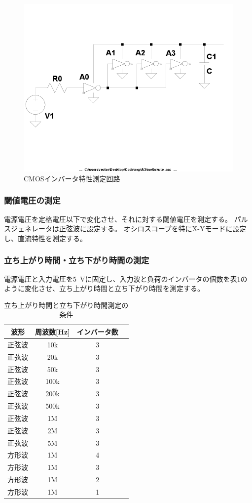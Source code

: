 \documentclass[10pt,a4j,dvipdfmx]{jsarticle}
\begin{document}
\begin{figure}[H]
       \centering
       \includegraphics[width=12cm]{invSokutei.png}
       \caption{CMOSインバータ特性測定回路}
\end{figure}

\subsubsection{閾値電圧の測定}
電源電圧を定格電圧以下で変化させ、それに対する閾値電圧を測定する。
パルスジェネレータは正弦波に設定する。
オシロスコープを特にX-Yモードに設定し、直流特性を測定する。
\subsubsection{立ち上がり時間・立ち下がり時間の測定}
電源電圧と入力電圧を\SI{5}{\volt}に固定し、入力波と負荷のインバータの個数を表1のように変化させ、立ち上がり時間と立ち下がり時間を測定する。

\begin{table}
  \begin{center}
    \caption{立ち上がり時間と立ち下がり時間測定の条件}
    \begin{tabular}{|c|c|c|c|} \hline
      波形 & 周波数[\si{\hertz}] & インバータ数 \\ \hline \hline
      正弦波 & 10k & 3 \\
      正弦波 & 20k & 3 \\
      正弦波 & 50k & 3 \\
      正弦波 & 100k & 3 \\
      正弦波 & 200k & 3 \\
      正弦波 & 500k & 3 \\
      正弦波 & 1M & 3 \\
      正弦波 & 2M & 3 \\
      正弦波 & 5M & 3 \\
      方形波 & 1M & 4 \\             
      方形波 & 1M & 3 \\
      方形波 & 1M & 2 \\
      方形波 & 1M & 1 \\
      \hline
    \end{tabular}
  \end{center}
\end{table}
\end{document}
